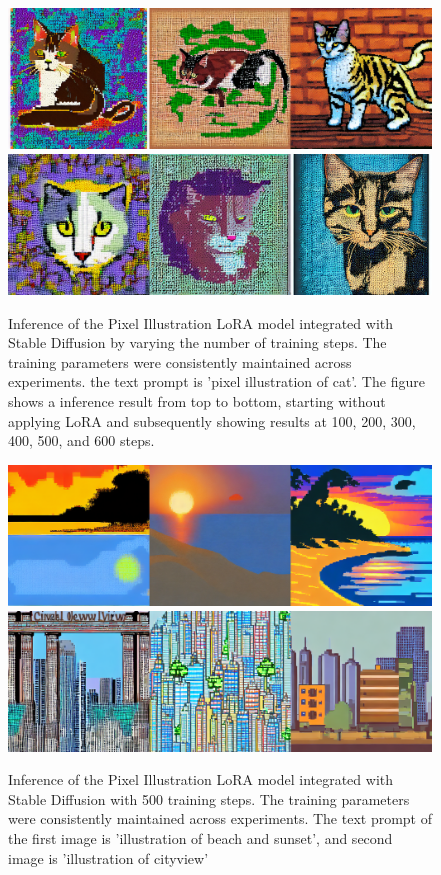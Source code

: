 \documentclass[extendedabs]{bmvc2k}
\begin{document}
\begin{figure}[t]
    \includegraphics[width=\linewidth]{images/cat500.png}
    \includegraphics[width=\linewidth]{images/cat600.png}
	\caption{
		Inference of the Pixel Illustration LoRA model integrated with Stable Diffusion by varying the number of training steps. The training parameters were consistently maintained across experiments. the text prompt is 'pixel illustration of cat'. The figure shows a inference result from top to bottom, starting without applying LoRA and subsequently showing results at 100, 200, 300, 400, 500, and 600 steps.}
	\vspace{-2mm}
        \label{fig:pixelresult1}
\end{figure}

\begin{figure}[t]
\centering
	\includegraphics[width=\linewidth]{images/beach sunset500.png}
    \includegraphics[width=\linewidth]{images/city500.png}
    
	\caption{
		Inference of the Pixel Illustration LoRA model integrated with Stable Diffusion with 500 training steps. The training parameters were consistently maintained across experiments. The text prompt of the first image is 'illustration of beach and sunset', and second image is 'illustration of cityview'}
	\vspace{-2mm}
        \label{fig:pixelresult2}
\end{figure}
\end{document}
